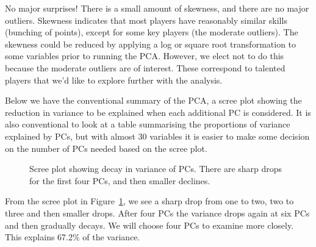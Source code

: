 \documentclass[
  letterpaper,
]{krantz}
\begin{document}
No major surprises! There is a small amount of skewness, and there are
no major outliers. Skewness indicates that most players have reasonably
similar skills (bunching of points), except for some key players (the
moderate outliers). The skewness could be reduced by applying a log or
square root transformation to some variables prior to running the PCA.
However, we elect not to do this because the moderate outliers are of
interest. These correspond to talented players that we'd like to explore
further with the analysis.

Below we have the conventional summary of the PCA, a scree plot showing
the reduction in variance to be explained when each additional PC is
considered. It is also conventional to look at a table summarising the
proportions of variance explained by PCs, but with almost 30 variables
it is easier to make some decision on the number of PCs needed based on
the scree plot.

\begin{figure}


\caption{\label{fig-aflw-pca}Scree plot showing decay in variance of
PCs. There are sharp drops for the first four PCs, and then smaller
declines.}

\end{figure}%


From the scree plot in Figure~\ref{fig-aflw-pca}, we see a sharp drop
from one to two, two to three and then smaller drops. After four PCs the
variance drops again at six PCs and then gradually decays. We will
choose four PCs to examine more closely. This explains 67.2\% of the
variance.
\end{document}

